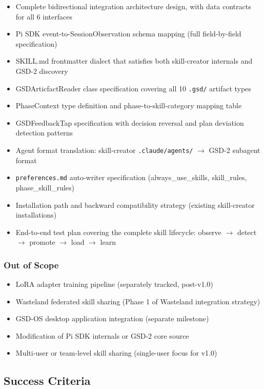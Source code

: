 \documentclass[11pt,letterpaper]{article}
\begin{document}
\begin{itemize}
  \item Complete bidirectional integration architecture design, with data contracts for all 6 interfaces
  \item Pi SDK event-to-SessionObservation schema mapping (full field-by-field specification)
  \item SKILL.md frontmatter dialect that satisfies both skill-creator internals and GSD-2 discovery
  \item GSDArticfactReader class specification covering all 10 \texttt{.gsd/} artifact types
  \item PhaseContext type definition and phase-to-skill-category mapping table
  \item GSDFeedbackTap specification with decision reversal and plan deviation detection patterns
  \item Agent format translation: skill-creator \texttt{.claude/agents/} $\to$ GSD-2 subagent format
  \item \texttt{preferences.md} auto-writer specification (always\_use\_skills, skill\_rules, phase\_skill\_rules)
  \item Installation path and backward compatibility strategy (existing skill-creator installations)
  \item End-to-end test plan covering the complete skill lifecycle: observe $\to$ detect $\to$ promote $\to$ load $\to$ learn
\end{itemize}

\subsubsection{Out of Scope}

\begin{itemize}
  \item LoRA adapter training pipeline (separately tracked, post-v1.0)
  \item Wasteland federated skill sharing (Phase 1 of Wasteland integration strategy)
  \item GSD-OS desktop application integration (separate milestone)
  \item Modification of Pi SDK internals or GSD-2 core source
  \item Multi-user or team-level skill sharing (single-user focus for v1.0)
\end{itemize}

\subsection{Success Criteria}
\end{document}
